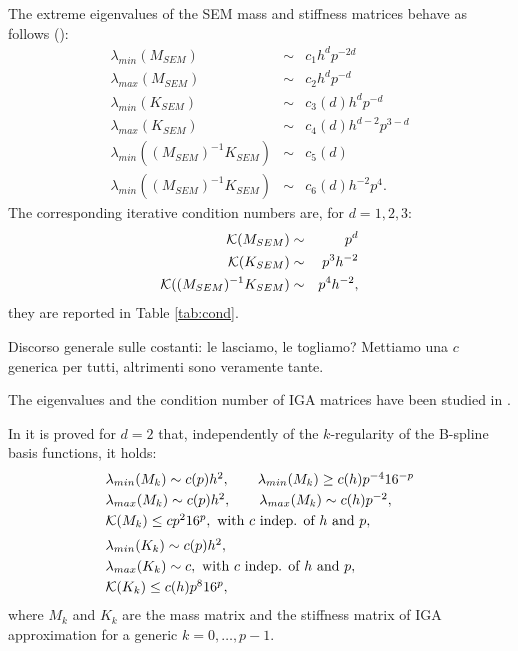 \documentclass[11pt]{article}
\newcommand{\pg}{\color{red}}
\begin{document}
The extreme eigenvalues of the
SEM mass and stiffness matrices behave as follows (\cite{bm,melenk02,
chqz06,chqz07}):
\begin{eqnarray}
\label{eigminiM_sem}
\lambda_{min}(M_{SEM})&\sim& c_1 h^dp^{-2d} \\
\label{eigmaxM_sem}
\lambda_{max}(M_{SEM})&\sim& c_2 h^d p^{-d}\\
\label{eigminK_sem}
\lambda_{min}(K_{SEM})&\sim& c_3(d) h^d p^{-d}\\
\label{eigmaxK_sem}
\lambda_{max}(K_{SEM})&\sim& c_4(d) h^{d-2} p^{3-d}\\
\label{eigmingen_sem}
\lambda_{min}((M_{SEM})^{-1}K_{SEM})&\sim& c_5(d)\\
\label{eigmaxgen_sem}
\lambda_{min}((M_{SEM})^{-1}K_{SEM})&\sim& c_6(d) h^{-2}p^{4}.
\end{eqnarray}
The corresponding iterative condition numbers are, for $d=1,2,3$:
\begin{eqnarray}
\label{condM_sem}
{\cal K}(M_{SEM})&\sim& p^{d}\\
\label{condK_sem}
{\cal K}(K_{SEM})&\sim&  p^{3} h^{-2}\\
\label{condgen_sem}
{\cal K}((M_{SEM})^{-1}K_{SEM})&\sim&  p^{4} h^{-2},
\end{eqnarray}
they are reported in  Table \ref{tab:cond}.

{\pg Discorso generale sulle costanti: le lasciamo, le togliamo? Mettiamo una 
$c$ generica per tutti, altrimenti sono veramente tante.}


The eigenvalues and the condition number of IGA matrices have been studied 
in \cite{Gahalaut_Tomar,gmpscs}. 

In \cite{Gahalaut_Tomar} it is proved for $d=2$ that, independently of the
$k$-regularity of the B-spline basis functions, it holds:
\begin{eqnarray}\label{stime_GT}
\begin{array}{l}
\lambda_{min}(M_{k})\sim c(p) h^2, \qquad 
\lambda_{min}(M_{k})\geq c(h) p^{-4}16^{-p}\\[1mm]
\lambda_{max}(M_{k})\sim c(p) h^2,\qquad
\lambda_{max}(M_{k})\sim c(h)p^{-2},\\[1mm]
{\cal K}(M_{k})\leq c p^{2} 16^{p},\mbox{ with $c$ indep. of $h$ and $p$},\\[2mm]
\lambda_{min}(K_{k})\sim c(p)h^2,\\ [1mm]
\lambda_{max}(K_{k})\sim c, \mbox{ with $c$ indep. of $h$ and $p$},\\[1mm]
{\cal K}(K_{k})\leq c(h) p^{8} 16^{p},
\end{array}
\end{eqnarray}
 where $M_{k}$ and $K_{k}$ are the mass matrix and the stiffness matrix
of IGA approximation for a generic $k=0,\ldots,p-1$.
\end{document}
